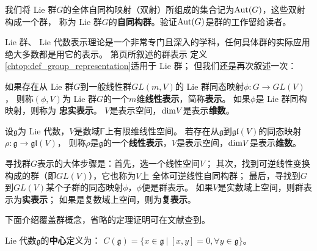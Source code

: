我们将 Lie 群$G$的全体自同构映射（双射）所组成的集合记为${\rm Aut}(G)$，这些双射构成一个群，
称为 Lie 群$G$的\textbf{自同构群}。验证${\rm Aut}(G)$是群的工作留给读者。



 Lie 群、 Lie 代数表示理论是一个非常专门且深入的学科，任何具体群的实际应用
绝大多数都是用它的表示。
第\pageref{chtop:def_group_representation}页所叙述的群表示
定义\ref{chtop:def_group_representation}适用于 Lie 群；
但我们还是再次叙述一次：
\begin{definition}
    如果存在从 Lie 群$G$到一般线性群$GL(m,V)$的 Lie 群同态映射$\phi:G\to GL(V)$，
    则称$(\phi,V)$为 Lie 群$G$的一个$m$维\textbf{线性表示}，简称\textbf{表示}。
    如果$\phi$是 Lie 群同构映射，则称为\textbf{ 忠实表示}。
    $V$是表示空间，${\rm dim}V$是表示\textbf{维数}。
\end{definition}

\begin{definition}
    设$\mathfrak{g}$为 Lie 代数，$V$是数域$\mathbb{F}$上有限维线性空间。
    若存在从$\mathfrak{g}$到$\mathfrak{gl}(V)$的同态映射$\rho : \mathfrak{g}\to \mathfrak{gl}(V)$，
    则称$\rho$是$\mathfrak{g}$的一个\textbf{线性表示}，$V$是表示空间，${\rm dim}V$是表示\textbf{维数}。
\end{definition}


寻找群$G$表示的大体步骤是：首先，选一个线性空间$V$；
其次，找到可逆线性变换构成的群（即$GL(V)$），它也称为$V$上
全体可逆线性自同构群；
最后，寻找到$G$到$GL(V)$某个子群的同态映射$\phi$，$\phi$便是群表示。
如果$V$是实数域上空间，则群表示为\textbf{实表示}；
如果是复数域上空间，则为\textbf{复表示}。




下面介绍覆盖群概念，省略的定理证明可在文献\parencite[p.231--240]{xuyc-2001}查到。
\begin{definition}
     Lie 代数$\mathfrak{g}$的\textbf{中心}定义为：
    $C(\mathfrak{g})=\{x\in \mathfrak{g}\ |\ [x,y]=0,\forall y\in\mathfrak{g}\}$。
\end{definition}

 

